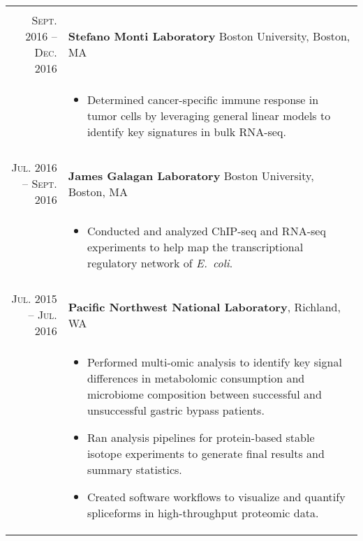 \documentclass[a4paper,10pt]{report}
\begin{document}
\begin{longtable}{r|p{10cm}}
	\multicolumn{2}{c}{}
	\\[-0.75em]
	\textsc{Sept. 2016 -- Dec. 2016} & \textbf{Stefano Monti Laboratory} Boston University, Boston, MA    \\
	                                 & \footnotesize{
		\vspace{-3.5mm}
		\begin{itemize}
			\setlength\itemsep{0em}
			\item Determined cancer-specific immune response in
			      tumor cells by leveraging general linear models to identify key signatures in bulk RNA-seq.
		\end{itemize}
	} \vspace{-3.5mm}                                                                                     \\
	\multicolumn{2}{c}{}
	\\[-0.75em]
	\textsc{Jul. 2016 -- Sept. 2016} & \textbf{James Galagan Laboratory} Boston University, Boston, MA    \\                                                                  	                                 & \footnotesize{
		\vspace{-3.5mm}
		\begin{itemize}
			\setlength\itemsep{0em}
			\item Conducted and analyzed ChIP-seq and RNA-seq experiments to help map the transcriptional
			      regulatory network of \emph{E.\ coli}.
		\end{itemize}
	} \vspace{-3.5mm}                                                                                     \\
	\multicolumn{2}{c}{}
	\\[3.75em]
	\textsc{Jul. 2015 -- Jul. 2016}  & \textbf{Pacific Northwest National Laboratory}, Richland, WA       \\
	                                 & \footnotesize{
		\vspace{-3.5mm}
		\begin{itemize}
			\setlength\itemsep{0em}
			\item Performed multi-omic analysis to identify key signal differences in metabolomic consumption and microbiome composition between successful and
			      unsuccessful gastric bypass patients.
			\item Ran analysis pipelines for protein-based stable isotope experiments to generate final results and summary statistics.
			\item Created software workflows to visualize and quantify spliceforms in high-throughput proteomic data.

\end{itemize}}
\end{longtable}
\end{document}
